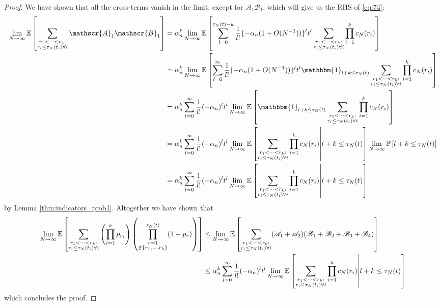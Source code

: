 \documentclass{article}
\newcommand{\Prob}{\mathbb{P}}
\newcommand{\E}{\mathbb{E}}
\newcommand{\1}[1]{\mathbbm{1}_{#1}}
\begin{document}
\begin{proof}
We have shown that all the cross-terms vanish in the limit, except for $\mathscr{A}_1 \mathscr{B}_1$, which will give us the RHS of \eqref{eq:74}:
\begin{align}
\lim_{N\to\infty}\E\left[ \sum_{\substack{r_1 <\dots< r_k :\\ r_i \leq \tau_N(t_i) \forall i}} \mathscr{A}_1 \mathscr{B}_1 \right]
&= \alpha_n^k  \lim_{N\to\infty}
\E\left[ \sum_{l=0}^{\tau_N(t) -k} \frac{1}{l!} \{ - \alpha_n (1+O(N^{-1})) \}^l t^l \sum_{\substack{r_1 <\dots< r_k :\\ r_i \leq \tau_N(t_i) \forall i}} \prod_{i=1}^k  c_N(r_i) \right] \notag\\
&= \alpha_n^k  \lim_{N\to\infty}
\E\left[ \sum_{l=0}^{\infty} \frac{1}{l!} \{ - \alpha_n (1+O(N^{-1})) \}^l t^l \1{l+k \leq \tau_N(t)} \sum_{\substack{r_1 <\dots< r_k :\\ r_i \leq \tau_N(t_i) \forall i}} \prod_{i=1}^k  c_N(r_i) \right] \notag\\
&= \alpha_n^k \sum_{l=0}^{\infty} \frac{1}{l!} (- \alpha_n)^l t^l \lim_{N\to\infty}
\E\left[ \1{l+k \leq \tau_N(t)} \sum_{\substack{r_1 <\dots< r_k :\\ r_i \leq \tau_N(t_i) \forall i}} \prod_{i=1}^k  c_N(r_i) \right] \notag\\ 
&= \alpha_n^k \sum_{l=0}^{\infty} \frac{1}{l!} (- \alpha_n)^l t^l \lim_{N\to\infty}
\E\left[ \sum_{\substack{r_1 <\dots< r_k :\\ r_i \leq \tau_N(t_i) \forall i}} \prod_{i=1}^k  c_N(r_i) \middle| l+k \leq \tau_N(t) \right] 
\lim_{N\to\infty} \Prob\left[ l+k \leq \tau_N(t) \right] \notag\\ 
&= \alpha_n^k \sum_{l=0}^{\infty} \frac{1}{l!} (- \alpha_n)^l t^l \lim_{N\to\infty}
\E\left[ \sum_{\substack{r_1 <\dots< r_k :\\ r_i \leq \tau_N(t_i) \forall i}} \prod_{i=1}^k  c_N(r_i) \middle| l+k \leq \tau_N(t) \right]
\end{align}
by Lemma \ref{thm:indicators_prob1}.
Altogether we have shown that 
\begin{align}
\lim_{N\to\infty} \E \left[ \sum_{\substack{r_1 <\dots< r_k :\\ r_i \leq \tau_N(t_i) \forall i}}
\left( \prod_{i=1}^k p_{r_i} \right)
\left( \prod_{\substack{r=1 \\ \notin \{r_1,\dots,r_k\} }}^{\tau_N(t)} (1-p_r) \right) \right]
&\leq \lim_{N\to\infty} \E \left[ \sum_{\substack{r_1 <\dots< r_k :\\ r_i \leq \tau_N(t_i) \forall i}}
(\mathscr{A}_1 + \mathscr{A}_2) (\mathscr{B}_1 + \mathscr{B}_2 + \mathscr{B}_3 + \mathscr{B}_4) \right] \notag\\
& \leq \alpha_n^k \sum_{l=0}^{\infty} \frac{1}{l!} (- \alpha_n)^l t^l \lim_{N\to\infty}
\E\left[ \sum_{\substack{r_1 <\dots< r_k :\\ r_i \leq \tau_N(t_i) \forall i}} \prod_{i=1}^k  c_N(r_i) \middle| l+k \leq \tau_N(t) \right] 
\end{align}
which concludes the proof.
\end{proof}
\end{document}
